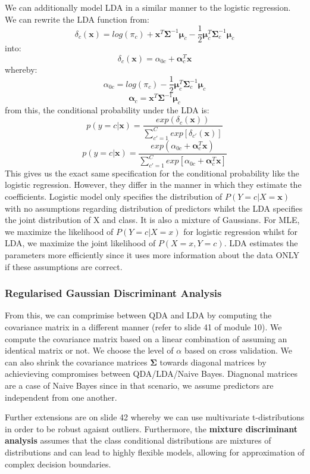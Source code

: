\documentclass[11pt, oneside]{article}
\theoremstyle{definition}
\begin{document}
We can additionally model LDA in a similar manner to the logistic regression. We can rewrite the LDA function from:
$$
\delta_c(\bm{x}) = log(\pi_c) + \bm{x}^T\bm{\Sigma}^{-1}\bm{\mu}_c - \frac{1}{2}\bm{\mu}_c^T\bm{\Sigma}_c^{-1}\bm{\mu}_c
$$
into:
$$
\delta_c(\bm{x}) = \alpha_{0c} + \bm{\alpha}_c^T\bm{x}
$$
whereby:
$$
\alpha_{0c} = log(\pi_c) - \frac{1}{2}\bm{\mu}_c^T\bm{\Sigma}_c^{-1}\bm{\mu}_c
$$
$$
\bm{\alpha}_c = \bm{x}^T\bm{\Sigma}^{-1}\bm{\mu}_c
$$
from this, the conditional probability under the LDA is:
$$
p(y=c|\bm{x}) = \frac{exp(\delta_c(\bm{x}))}{\sum\limits_{c'=1}^{C}exp[\delta_{c'}(\bm{x})]}
$$
$$
p(y=c|\bm{x}) = \frac{exp(\alpha_{0c} + \bm{\alpha}_c^T\bm{x})}{\sum\limits_{c'=1}^{C}exp[\alpha_{0c} + \bm{\alpha}_c^T\bm{x}]}
$$
This gives us the exact same specification for the conditional probability like the logistic regression. However, they differ in the manner in which they estimate the coefficients. Logistic model only specifies the distribution of $P(Y=c|X=\bm{x})$ with no assumptions regarding distribution of predictors whilst the LDA specifies the joint distribution of X and class. It is also a mixture of Gaussians. For MLE, we maximize the likelihood of $P(Y=c|X=x)$ for logistic regression whilst for LDA, we maximize the joint likelihood of $P(X=x,Y=c)$. LDA estimates the parameters more efficiently since it uses more information about the data ONLY if these assumptions are correct.

\subsubsection{Regularised Gaussian Discriminant Analysis}
From this, we can comprimise between QDA and LDA by computing the covariance matrix in a different manner (refer to slide 41 of module 10). We compute the covariance matrix based on a linear combination of assuming an identical matrix or not. We choose the level of $\alpha$ based on cross validation. We can also shrink the covariance matrices $\bm{\Sigma}$ towards diagonal matrices by achievieving compromises between QDA/LDA/Naive Bayes. Diagnonal matrices are a case of Naive Bayes since in that scenario, we assume predictors are independent from one another.

Further extensions are on slide 42 whereby we can use multivariate t-distributions in order to be robust agaisnt outliers. Furthermore, the \textbf{mixture discriminant analysis} assumes that the class conditional distributions are mixtures of distributions and can lead to highly flexible models, allowing for approximation of complex decision boundaries.
\end{document}
